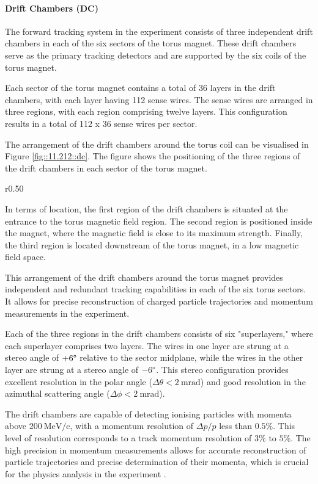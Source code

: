 \paragraph{Drift Chambers (DC)}
    The forward tracking system in the experiment consists of three independent drift chambers in each of the six sectors of the torus magnet.
    These drift chambers serve as the primary tracking detectors and are supported by the six coils of the torus magnet.

    Each sector of the torus magnet contains a total of 36 layers in the drift chambers, with each layer having 112 sense wires.
    The sense wires are arranged in three regions, with each region comprising twelve layers.
    This configuration results in a total of 112 x 36 sense wires per sector.

    The arrangement of the drift chambers around the torus coil can be visualised in Figure \ref{fig::11.212::dc}.
    The figure shows the positioning of the three regions of the drift chambers in each sector of the torus magnet.

    \begin{wrapfigure}{r}{0.50\textwidth}
        \centering{}
        \caption[DC]{Drift Chambers render.
        Each of the DC regions are denoted as R1, R2, and R3 in the figure.
        Source: \hyperlink{jlab.org/physics/hall-b/clas12}{CLAS12 wiki}.}
        \label{fig::11.212::dc}
    \end{wrapfigure}

    In terms of location, the first region of the drift chambers is situated at the entrance to the torus magnetic field region.
    The second region is positioned inside the magnet, where the magnetic field is close to its maximum strength.
    Finally, the third region is located downstream of the torus magnet, in a low magnetic field space.

    This arrangement of the drift chambers around the torus magnet provides independent and redundant tracking capabilities in each of the six torus sectors.
    It allows for precise reconstruction of charged particle trajectories and momentum measurements in the experiment.

    Each of the three regions in the drift chambers consists of six "superlayers," where each superlayer comprises two layers.
    The wires in one layer are strung at a stereo angle of $+6\degree$ relative to the sector midplane, while the wires in the other layer are strung at a stereo angle of $-6\degree$.
    This stereo configuration provides excellent resolution in the polar angle ($\Delta\theta < 2 ~\text{mrad}$) and good resolution in the azimuthal scattering angle ($\Delta\phi < 2 ~\text{mrad}$).

    The drift chambers are capable of detecting ionising particles with momenta above $200 ~\text{MeV}/\text{c}$, with a momentum resolution of $\Delta p/p$ less than $0.5\%$. This level of resolution corresponds to a track momentum resolution of $3\%$ to $5\%$.
    The high precision in momentum measurements allows for accurate reconstruction of particle trajectories and precise determination of their momenta, which is crucial for the physics analysis in the experiment \cite{mestayer2020}.
